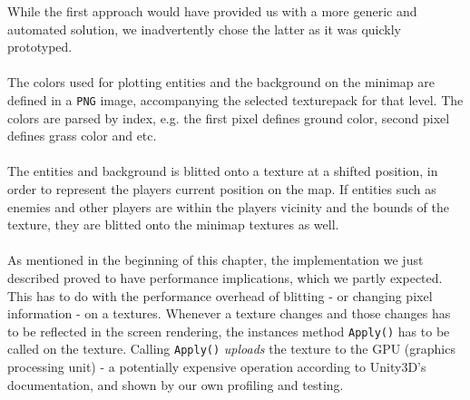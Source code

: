 While the first approach would have provided us with a more generic and
automated solution, we inadvertently chose the latter as it was quickly
prototyped.
\\
\\
The colors used for plotting entities and the background on the minimap are
defined in a \texttt{PNG} image, accompanying the selected texturepack for that
level. The colors are parsed by index, e.g. the first pixel defines ground
color, second pixel defines grass color and etc.
\\
\\
The entities and background is blitted onto a texture at a shifted position, in
order to represent the players current position on the map. If entities such as
enemies and other players are within the players vicinity and the bounds of the
texture, they are blitted onto the minimap textures as well.
\\
\\
As mentioned in the beginning of this chapter, the implementation we just
described proved to have performance implications, which we
partly expected. This has to do with the performance overhead of blitting - or
changing pixel information - on a textures. Whenever a texture changes and
those changes has to be reflected in the screen rendering, the instances method
\texttt{Apply()} has to be called on the texture. Calling \texttt{Apply()}
\textit{uploads} the texture to the GPU (graphics processing unit) - a
potentially expensive operation according to Unity3D's documentation, and shown
by our own profiling and testing.

